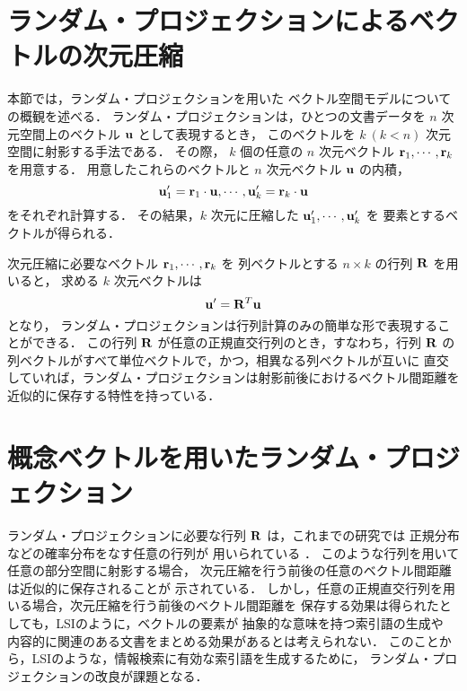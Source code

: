 \section{ランダム・プロジェクションによるベクトルの次元圧縮}
本節では，ランダム・プロジェクションを用いた
ベクトル空間モデル\cite{Papadimitriou}\cite{Arriaga}についての概観を述べる．
ランダム・プロジェクションは，ひとつの文書データを 
$n$ 次元空間上のベクトル ${\bf u}$ として表現するとき，
このベクトルを $k\ (k < n)$ 次元空間に射影する手法である．
その際， $k$ 個の任意の $n$ 次元ベクトル ${\bf r}_1, \cdots , {\bf r}_k$ 
を用意する．
用意したこれらのベクトルと $n$ 次元ベクトル ${\bf u}$ の内積，
\begin{equation}
{\bf u}'_1 = {\bf r}_1 \cdot {\bf u}, \cdots , {\bf u}'_k ={\bf r}_k \cdot {\bf u}
\end{equation}
をそれぞれ計算する．
その結果，$k$ 次元に圧縮した ${\bf u}'_1, \cdots , {\bf u}'_k$ を
要素とするベクトルが得られる．

次元圧縮に必要なベクトル ${\bf r}_1, \cdots , {\bf r}_k$ を
列ベクトルとする $n \times k$ の行列 ${\bf R}$ を用いると，
求める $k$ 次元ベクトルは
\begin{equation}
{\bf u}' = {\bf R}^T {\bf u}
\end{equation}
となり，
ランダム・プロジェクションは行列計算のみの簡単な形で表現することができる．
この行列 ${\bf R}$ が任意の正規直交行列のとき，すなわち，行列 ${\bf R}$ の
列ベクトルがすべて単位ベクトルで，かつ，相異なる列ベクトルが互いに
直交していれば，ランダム・プロジェクションは射影前後におけるベクトル間距離を
近似的に保存する特性を持っている．

\section{概念ベクトルを用いたランダム・プロジェクション}
ランダム・プロジェクションに必要な行列 ${\bf R}$ は，これまでの研究では
正規分布などの確率分布をなす任意の行列が
用いられている\cite{Papadimitriou}\cite{Vempala}\cite{Arriaga}
\cite{Kleinberg}\cite{Blum}\cite{Feige}．
このような行列を用いて任意の部分空間に射影する場合，
次元圧縮を行う前後の任意のベクトル間距離は近似的に保存されることが
示されている\cite{Frankl}\cite{Johnson}．
しかし，任意の正規直交行列を用いる場合，次元圧縮を行う前後のベクトル間距離を
保存する効果は得られたとしても，LSIのように，ベクトルの要素が
抽象的な意味を持つ索引語の生成や
内容的に関連のある文書をまとめる効果があるとは考えられない．
このことから，LSIのような，情報検索に有効な索引語を生成するために，
ランダム・プロジェクションの改良が課題となる．

